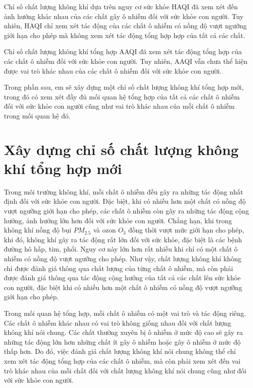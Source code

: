 \documentclass[14pt]{extreport}
\theoremstyle{definition}
\theoremstyle{plain}
\theoremstyle{remark}
\begin{document}
Chỉ số chất lượng không khí dựa trên nguy cơ sức khỏe HAQI đã xem xét đến ảnh hưởng khác nhau của các chất gây ô nhiễm đối với sức khỏe con người. Tuy nhiên, HAQI chỉ xem xét tác động của các chất ô nhiễm có nồng độ vượt ngưỡng giới hạn cho phép mà không xem xét tác động tổng hợp hợp của tất cả các chất. 

Chỉ số chất lượng không khí tổng hợp AAQI đã xem xét tác động tổng hợp của các chất ô nhiễm đối với sức khỏe con người. Tuy nhiên, AAQI vẫn chưa thể hiện được vai trò khác nhau của các chất ô nhiễm đối với sức khỏe con người. 

Trong phần sau, em sẽ xây dựng một chỉ số chất lượng không khí tổng hợp mới, trong đó có xem xét đầy đủ mối quan hệ tổng hợp của tất cả các chất ô nhiễm đối với sức khỏe con người cũng như vai trò khác nhau của mỗi chất ô nhiễm trong mối quan hệ đó.

\section{Xây dựng chỉ số chất lượng không khí tổng hợp mới}
Trong môi trường không khí, mỗi chất ô nhiễm đều gây ra những tác động nhất định đối với sức khỏe con người. Đặc biệt, khi có nhiều hơn một chất có nồng độ vượt ngưỡng giới hạn cho phép, các chất ô nhiễm còn gây ra những tác động cộng hưởng, ảnh hưởng lớn hơn đối với sức khỏe con người. Chẳng hạn, khi trong không khí nồng độ bụi $PM_{2.5}$ và ozon $O_3$ đồng thời vượt mức giới hạn cho phép, khi đó, không khí gây ra tác động rất lớn đối với sức khỏe, đặc biệt là các bệnh đường hô hấp, tim, phổi. Nguy cơ này lớn hơn rất nhiều khi chỉ có một chất ô nhiễm có nồng độ vượt ngưỡng cho phép. Như vậy, chất lượng không khí không chỉ được đánh giá thông qua chất lượng của từng chất ô nhiễm, mà còn phải được đánh giá thông qua tác động cộng hưởng của tất cả các chất lên sức khỏe con người, đặc biệt khi có nhiều hơn một chất ô nhiễm có nồng độ vượt ngưỡng giới hạn cho phép.

Trong mối quan hệ tổng hợp, mỗi chất ô nhiễm có một vai trò và tác động riêng. Các chất ô nhiễm khác nhau có vai trò không giống nhau đối với chất lượng không khí nói chung. Các chất thường xuyên bị ô nhiễm ở mức độ cao sẽ gây ra những tác động lớn hơn những chất ít gây ô nhiễm hoặc gây ô nhiễm ở mức độ thấp hơn. Do đó, việc đánh giá chất lượng không khí nói chung không thể chỉ xem xét tác động tổng hợp của các chất ô nhiễm, mà còn phải xem xét đến vai trò khác nhau của mỗi chất đối với chất lượng không khí nói chung cũng như đối với sức khỏe con người.
\end{document}
